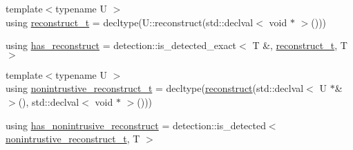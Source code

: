 \begin{DoxyCompactItemize}
\item 
{\footnotesize template$<$typename U $>$ }\\using \hyperlink{structcheckpoint_1_1_serializable_traits_a9f161977ecf1aed8a4ccd5d63768399a}{reconstruct\+\_\+t} = decltype(U\+::reconstruct(std\+::declval$<$ void $\ast$ $>$()))
\item 
using \hyperlink{structcheckpoint_1_1_serializable_traits_a1c37f2f1a317fdd0d198c3d6ad2d35c4}{has\+\_\+reconstruct} = detection\+::is\+\_\+detected\+\_\+exact$<$ T \&, \hyperlink{structcheckpoint_1_1_serializable_traits_a9f161977ecf1aed8a4ccd5d63768399a}{reconstruct\+\_\+t}, T $>$
\item 
{\footnotesize template$<$typename U $>$ }\\using \hyperlink{structcheckpoint_1_1_serializable_traits_abe5231bdf561e55fd9e0673e42a8a96c}{nonintrustive\+\_\+reconstruct\+\_\+t} = decltype(\hyperlink{namespacecheckpoint_a6254f2e220f905a2b0c797c08092a7a1}{reconstruct}(std\+::declval$<$ U $\ast$\& $>$(), std\+::declval$<$ void $\ast$ $>$()))
\item 
using \hyperlink{structcheckpoint_1_1_serializable_traits_aeaa2e5459d2910f2ed6a8e423b45552b}{has\+\_\+nonintrusive\+\_\+reconstruct} = detection\+::is\+\_\+detected$<$ \hyperlink{structcheckpoint_1_1_serializable_traits_abe5231bdf561e55fd9e0673e42a8a96c}{nonintrustive\+\_\+reconstruct\+\_\+t}, T $>$
\end{DoxyCompactItemize}

